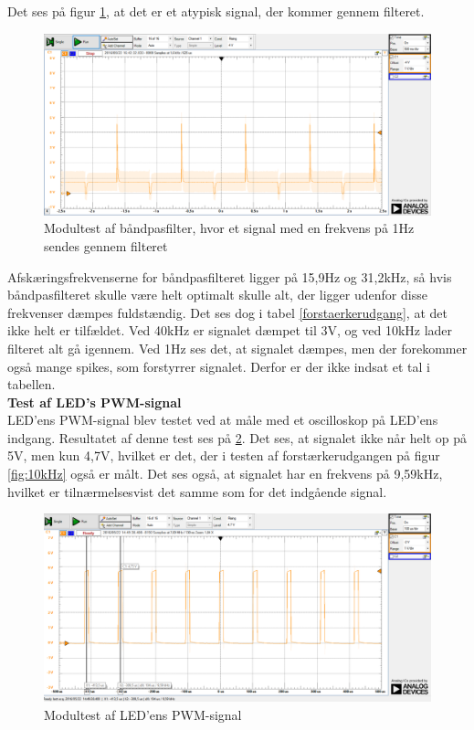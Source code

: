 Det ses på figur \ref{fig:1Hz}, at det er et atypisk signal, der kommer gennem filteret. 

\begin{figure}[H]
	\centering
	\includegraphics[width=\textwidth]{Test/images/AffyringTest/BaandpasfilterTest/1Hz}
	\caption{Modultest af båndpasfilter, hvor et signal med en frekvens på 1Hz sendes gennem filteret}
	\label{fig:1Hz}
\end{figure}

Afskæringsfrekvenserne for båndpasfilteret ligger på 15,9Hz og 31,2kHz, så hvis båndpasfilteret skulle være helt optimalt skulle alt, der ligger udenfor disse frekvenser dæmpes fuldstændig. Det ses dog i tabel \ref{forstaerkerudgang}, at det ikke helt er tilfældet. Ved 40kHz er signalet dæmpet til 3V, og ved 10kHz lader filteret alt gå igennem. Ved 1Hz ses det, at signalet dæmpes, men der forekommer også mange spikes, som forstyrrer signalet. Derfor er der ikke indsat et tal i tabellen. \\

\noindent \textbf{Test af LED's PWM-signal} \\
\noindent LED'ens PWM-signal blev testet ved at måle med et oscilloskop på LED'ens indgang. Resultatet af denne test ses på \ref{fig:LED_indgang}. Det ses, at signalet ikke når helt op på 5V, men kun 4,7V, hvilket er det, der i testen af forstærkerudgangen på figur \ref{fig:10kHz} også er målt. Det ses også, at signalet har en frekvens på 9,59kHz, hvilket er tilnærmelsesvist det samme som for det indgående signal. 

\begin{figure}[H]
	\centering
	\includegraphics[width=\textwidth]{Test/images/AffyringTest/LED_indgang}
	\caption{Modultest af LED'ens PWM-signal}
	\label{fig:LED_indgang}
\end{figure}

